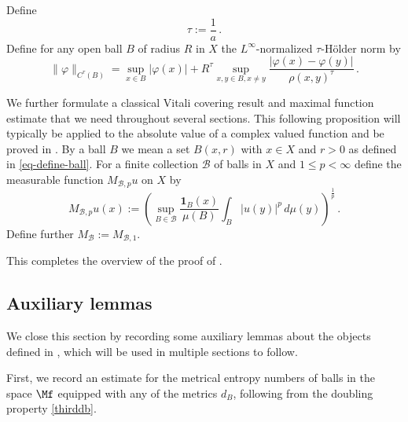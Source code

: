 Define
\begin{equation}
    \tau:=\frac 1a\, .
\end{equation}
Define for any open ball $B$ of radius $R$ in $X$ the $L^\infty$-normalized $\tau$-H\"older norm by
\begin{equation}
    \label{eq-Holder-norm}
    \|\varphi\|_{C^\tau(B)} = \sup_{x \in B} |\varphi(x)| + R^\tau \sup_{x,y \in B, x \neq y} \frac{|\varphi(x) - \varphi(y)|}{\rho(x,y)^\tau}\,.
\end{equation}



We further formulate a classical Vitali covering result
and maximal function estimate that we need throughout several sections.
This following proposition will typically be applied to the absolute value of a complex valued function and be proved in . By a ball $B$ we mean a set $B(x,r)$ with $x\in X$
and $r>0$ as defined in \eqref{eq-define-ball}.
For a finite collection $\mathcal{B}$ of balls in $X$
and $1\le p< \infty$ define the measurable function $M_{\mathcal{B},p}u$ on $X$ by
\begin{equation}\label{def-hlm}
    M_{\mathcal{B},p}u(x):=\left(\sup_{B\in \mathcal{B}} \frac{\mathbf{1}_{B}(x)}{\mu(B)}\int _{B} |u(y)|^p\, d\mu(y)\right)^\frac 1p\, .
\end{equation}
Define further $M_{\mathcal{B}}:=M_{\mathcal{B},1}$.


This completes the overview of the proof of .

\subsection{Auxiliary lemmas}
\label{global-auxiliary-lemmas}
We close this section by recording some auxiliary lemmas about the objects defined in , which will be used in multiple sections to follow.

First, we record an estimate for the metrical entropy numbers of balls in the space $\Mf$ equipped with any of the metrics $d_B$, following from the doubling property \eqref{thirddb}.




